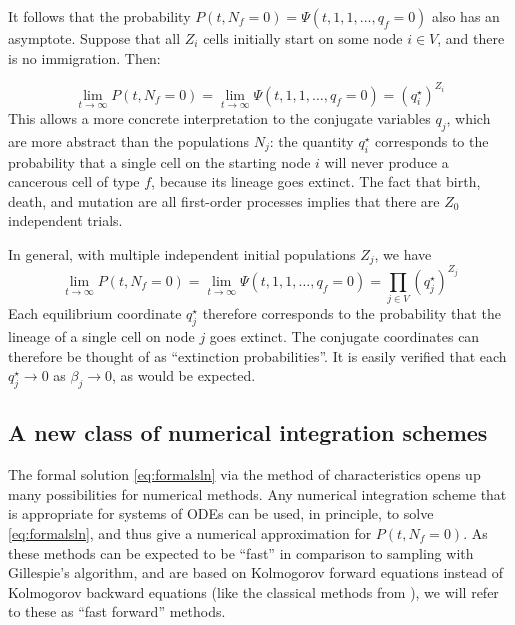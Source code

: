 \documentclass{article}
\begin{document}
It follows that the probability $P(t,N_f = 0) = \Psi(t, 1,1,\dots,q_f = 0)$ also
has an asymptote. Suppose that all $Z_i$ cells initially start on some node $i \in
V$, and there is no immigration. Then:

\begin{equation}
    \lim_{t\rightarrow \infty} P(t, N_f = 0) = 
    \lim_{t\rightarrow \infty} \Psi(t,1,1,\dots,q_f=0) =
    \left(q^\star_i\right)^{Z_i}
\end{equation}
This allows a more concrete interpretation to the conjugate variables $q_j$,
which are more abstract than the populations $N_j$: the
quantity $q^\star_i$ corresponds to the probability that a single cell on the
starting node $i$ will never produce a cancerous cell of type $f$, because its lineage goes
extinct. The fact that birth, death, and mutation are all first-order processes
implies that there are $Z_0$ independent trials.

In general, with multiple independent initial populations $Z_j$, we have 
\begin{equation}
    \lim_{t\rightarrow \infty} P(t, N_f = 0) = 
    \lim_{t\rightarrow \infty} \Psi(t,1,1,\dots,q_f=0) =
    \prod_{j \in V} \left(q^\star_j\right)^{Z_j}
\end{equation}
Each equilibrium coordinate $q^\star_j$ therefore corresponds to the
probability that the lineage of a single cell on node $j$ goes extinct. The
conjugate coordinates can therefore be thought of as ``extinction probabilities''.
It is easily verified that each $q^\star_j \rightarrow 0$ as 
$\beta_j \rightarrow 0$, as would be expected.

\subsection{A new class of numerical integration schemes}

The formal solution \eqref{eq:formalsln} via the method of characteristics
opens up many possibilities for numerical methods. Any numerical integration
scheme that is appropriate for systems of ODEs can be used, in principle, to
solve \eqref{eq:formalsln}, and thus give a numerical approximation for $P(t,N_f
= 0)$. As these methods can be expected to be ``fast'' in comparison to sampling
with Gillespie's algorithm, and are based on Kolmogorov forward equations instead
of Kolmogorov backward equations (like the classical methods from
\cite{moolgavkar1979two,moolgavkar1992multistage,luebeck2013impact}), we will
refer to these as ``fast forward'' methods.
\end{document}
